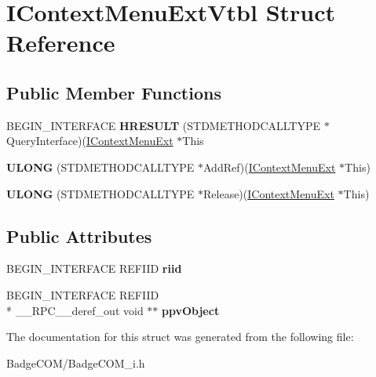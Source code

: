 \hypertarget{struct_i_context_menu_ext_vtbl}{\section{I\-Context\-Menu\-Ext\-Vtbl Struct Reference}
\label{struct_i_context_menu_ext_vtbl}
}
\subsection*{Public Member Functions}
\begin{DoxyCompactItemize}
\item 
\hypertarget{struct_i_context_menu_ext_vtbl_ab97c3c561842bf5e490734f59c658b52}{B\-E\-G\-I\-N\-\_\-\-I\-N\-T\-E\-R\-F\-A\-C\-E {\bfseries H\-R\-E\-S\-U\-L\-T} (S\-T\-D\-M\-E\-T\-H\-O\-D\-C\-A\-L\-L\-T\-Y\-P\-E $\ast$Query\-Interface)(\hyperlink{interface_i_context_menu_ext}{I\-Context\-Menu\-Ext} $\ast$This}\label{struct_i_context_menu_ext_vtbl_ab97c3c561842bf5e490734f59c658b52}

\item 
\hypertarget{struct_i_context_menu_ext_vtbl_a6e64a9290888e287921c40798d2f3986}{{\bfseries U\-L\-O\-N\-G} (S\-T\-D\-M\-E\-T\-H\-O\-D\-C\-A\-L\-L\-T\-Y\-P\-E $\ast$Add\-Ref)(\hyperlink{interface_i_context_menu_ext}{I\-Context\-Menu\-Ext} $\ast$This)}\label{struct_i_context_menu_ext_vtbl_a6e64a9290888e287921c40798d2f3986}

\item 
\hypertarget{struct_i_context_menu_ext_vtbl_a44b747c4608e6663360b572f35b697a7}{{\bfseries U\-L\-O\-N\-G} (S\-T\-D\-M\-E\-T\-H\-O\-D\-C\-A\-L\-L\-T\-Y\-P\-E $\ast$Release)(\hyperlink{interface_i_context_menu_ext}{I\-Context\-Menu\-Ext} $\ast$This)}\label{struct_i_context_menu_ext_vtbl_a44b747c4608e6663360b572f35b697a7}

\end{DoxyCompactItemize}
\subsection*{Public Attributes}
\begin{DoxyCompactItemize}
\item 
\hypertarget{struct_i_context_menu_ext_vtbl_accb17e6e94592943c398af06aecc3971}{B\-E\-G\-I\-N\-\_\-\-I\-N\-T\-E\-R\-F\-A\-C\-E R\-E\-F\-I\-I\-D {\bfseries riid}}\label{struct_i_context_menu_ext_vtbl_accb17e6e94592943c398af06aecc3971}

\item 
\hypertarget{struct_i_context_menu_ext_vtbl_a02bb8680b04b9bdb0364173d674cf108}{B\-E\-G\-I\-N\-\_\-\-I\-N\-T\-E\-R\-F\-A\-C\-E R\-E\-F\-I\-I\-D \\*
\-\_\-\-\_\-\-R\-P\-C\-\_\-\-\_\-deref\-\_\-out void $\ast$$\ast$ {\bfseries ppv\-Object}}\label{struct_i_context_menu_ext_vtbl_a02bb8680b04b9bdb0364173d674cf108}

\end{DoxyCompactItemize}


The documentation for this struct was generated from the following file\-:\begin{DoxyCompactItemize}
\item 
Badge\-C\-O\-M/Badge\-C\-O\-M\-\_\-i.\-h\end{DoxyCompactItemize}
